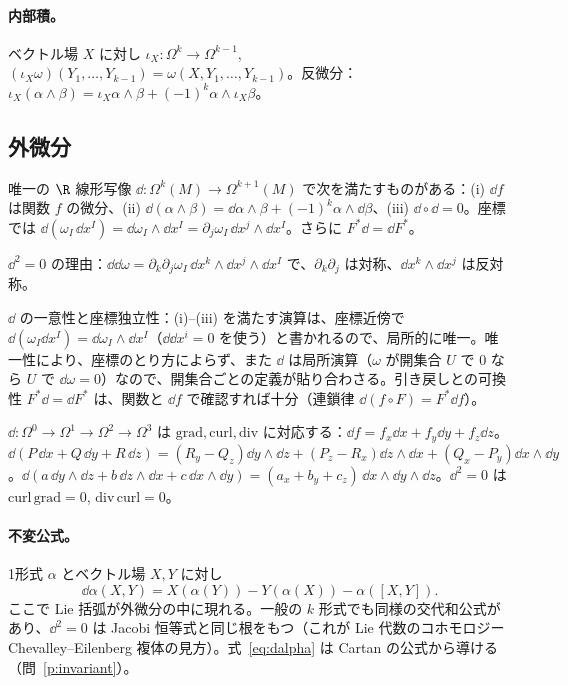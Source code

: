 \paragraph{内部積。}ベクトル場 $X$ に対し $\iota_X:\Omega^k\to\Omega^{k-1}$, $(\iota_X\omega)(Y_1,\dots,Y_{k-1})=\omega(X,Y_1,\dots,Y_{k-1})$。反微分：$\iota_X(\alpha\wedge\beta)=\iota_X\alpha\wedge\beta+(-1)^k\alpha\wedge\iota_X\beta$。

\subsection{外微分}
\begin{thm}[外微分]\tC
唯一の $\R$ 線形写像 $\dd:\Omega^k(M)\to\Omega^{k+1}(M)$ で次を満たすものがある：(i) $\dd f$ は関数 $f$ の微分、(ii) $\dd(\alpha\wedge\beta)=\dd\alpha\wedge\beta+(-1)^k\alpha\wedge\dd\beta$、(iii) $\dd\circ\dd=0$。座標では $\dd(\omega_I\,\dd x^I)=\dd\omega_I\wedge\dd x^I=\partial_j\omega_I\,\dd x^j\wedge\dd x^I$。さらに $F^*\dd=\dd F^*$。
\end{thm}

$\dd^2=0$ の理由：$\dd\dd\omega=\partial_k\partial_j\omega_I\,\dd x^k\wedge\dd x^j\wedge\dd x^I$ で、$\partial_k\partial_j$ は対称、$\dd x^k\wedge\dd x^j$ は反対称。


$\dd$ の一意性と座標独立性：(i)–(iii) を満たす演算は、座標近傍で $\dd(\omega_I\dd x^I)=\dd\omega_I\wedge\dd x^I$（$\dd\dd x^i=0$ を使う）と書かれるので、局所的に唯一。唯一性により、座標のとり方によらず、また $\dd$ は局所演算（$\omega$ が開集合 $U$ で $0$ なら $U$ で $\dd\omega=0$）なので、開集合ごとの定義が貼り合わさる。引き戻しとの可換性 $F^*\dd=\dd F^*$ は、関数と $\dd f$ で確認すれば十分（連鎖律 $\dd(f\circ F)=F^*\dd f$）。

\begin{ex}[$\R^3$ の古典ベクトル解析]
$\dd:\Omega^0\to\Omega^1\to\Omega^2\to\Omega^3$ は $\mathrm{grad},\mathrm{curl},\mathrm{div}$ に対応する：$\dd f=f_x\dd x+f_y\dd y+f_z\dd z$。$\dd(P\,\dd x+Q\,\dd y+R\,\dd z)=(R_y-Q_z)\dd y\wedge\dd z+(P_z-R_x)\dd z\wedge\dd x+(Q_x-P_y)\dd x\wedge\dd y$。$\dd(a\,\dd y\wedge\dd z+b\,\dd z\wedge\dd x+c\,\dd x\wedge\dd y)=(a_x+b_y+c_z)\,\dd x\wedge\dd y\wedge\dd z$。$\dd^2=0$ は $\mathrm{curl}\,\mathrm{grad}=0$, $\mathrm{div}\,\mathrm{curl}=0$。
\end{ex}

\paragraph{不変公式。}1形式 $\alpha$ とベクトル場 $X,Y$ に対し
\begin{equation}\label{eq:dalpha}
\dd\alpha(X,Y)=X(\alpha(Y))-Y(\alpha(X))-\alpha([X,Y]).
\end{equation}
ここで Lie 括弧が外微分の中に現れる。一般の $k$ 形式でも同様の交代和公式があり、$\dd^2=0$ は Jacobi 恒等式と同じ根をもつ（これが Lie 代数のコホモロジー Chevalley--Eilenberg 複体の見方）\tC。式~\eqref{eq:dalpha} は Cartan の公式から導ける（問~\ref{p:invariant}）。

